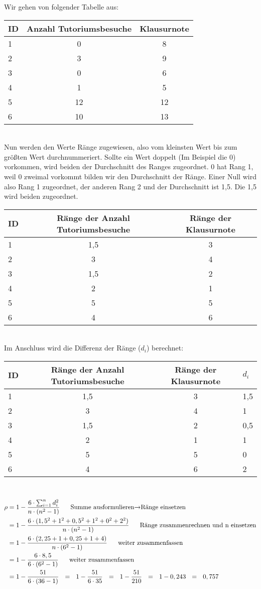 Wir gehen von folgender Tabelle aus:\\
\begin{tabular}[h!]{l|cc}
ID & Anzahl Tutoriumsbesuche & Klausurnote \\\hline
1 & 0 & 8 \\
2 & 3 & 9 \\
3 & 0 & 6 \\
4 & 1 & 5 \\
5 & 12& 12\\
6 & 10& 13\\
\end{tabular}\\
Nun werden den Werte Ränge zugewiesen, also vom kleinsten Wert bis zum größten Wert durchnummeriert. Sollte ein Wert doppelt (Im Beispiel die 0) vorkommen, wird beiden der Durchschnitt des Ranges zugeordnet. 0 hat Rang 1, weil 0 zweimal vorkommt bilden wir den Durchschnitt der Ränge. Einer Null wird also Rang 1 zugeordnet, der anderen Rang 2 und der Durchschnitt ist 1,5. Die 1,5 wird beiden zugeordnet.\\
\begin{tabular}[h!]{l|cc}
ID & Ränge der Anzahl Tutoriumsbesuche & Ränge der Klausurnote \\\hline
1 & 1,5 & 3 \\
2 & 3   & 4 \\
3 & 1,5 & 2 \\
4 & 2   & 1 \\
5 & 5   & 5 \\
6 & 4   & 6 \\
\end{tabular}\\
Im Anschluss wird die Differenz der Ränge ($d_i$) berechnet:\\
\begin{tabular}[h!]{l|cc}
ID & Ränge der Anzahl Tutoriumsbesuche & Ränge der Klausurnote & $d_i$ \\ & 1,5 & 3 & 1,5\\
2 & 3   & 4 & 1  \\
3 & 1,5 & 2 &0,5 \\
4 & 2   & 1 & 1  \\
5 & 5   & 5 & 0  \\
6 & 4   & 6 & 2  \\
\end{tabular}\\
\begin{align*}
\rho &= 1 - \frac{6 \cdot \sum^{n}_{i=1}{d^2_i}}{n \cdot (n^2-1)}~~~~~\textrm{Summe ausformulieren\textrightarrow Ränge einsetzen}\\
&= 1 - \frac{6 \cdot (1,5^2 + 1^2 + 0,5^2 + 1^2 + 0^2 + 2^2)}{n \cdot (n^2-1)}~~~~~\textrm{Ränge zusammenrechnen und n einsetzen}\\
&= 1 - \frac{6 \cdot (2,25 + 1 + 0,25 + 1 + 4)}{n \cdot (6^2-1)}~~~~~\textrm{weiter zusammenfassen}\\
&= 1 - \frac{6 \cdot 8,5}{6 \cdot (6^2-1)}~~~~~\textrm{weiter zusammenfassen}\\
&= 1 - \frac{51}{6 \cdot (36-1)}~~=~~1 - \frac{51}{6 \cdot 35}~~=~~1 - \frac{51}{210}~~=~~1 - 0,243 ~~=~~0,757
\end{align*}
